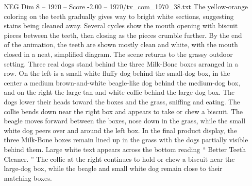 \begin{textsample}{NEG Dim 8 – 1970 – Score -2.00 – 1970/tv\_com\_1970\_38.txt}
The yellow-orange coloring on the teeth gradually gives way to bright white sections, suggesting stains being cleaned away.
Several cycles show the mouth opening with biscuit pieces between the teeth, then closing as the pieces crumble further.
By the end of the animation, the teeth are shown mostly clean and white, with the mouth closed in a neat, simplified diagram.
The scene returns to the grassy outdoor setting.
Three real dogs stand behind the three Milk-Bone boxes arranged in a row.
On the left is a small white fluffy dog behind the small-dog box, in the center a medium brown-and-white beagle-like dog behind the medium-dog box, and on the right the large tan-and-white collie behind the large-dog box.
The dogs lower their heads toward the boxes and the grass, sniffing and eating.
The collie bends down near the right box and appears to take or chew a biscuit.
The beagle moves forward between the boxes, nose down in the grass, while the small white dog peers over and around the left box.
In the final product display, the three Milk-Bone boxes remain lined up in the grass with the dogs partially visible behind them.
Large white text appears across the bottom reading “ Better Teeth Cleaner. ” The collie at the right continues to hold or chew a biscuit near the large-dog box, while the beagle and small white dog remain close to their matching boxes.

\end{textsample}
